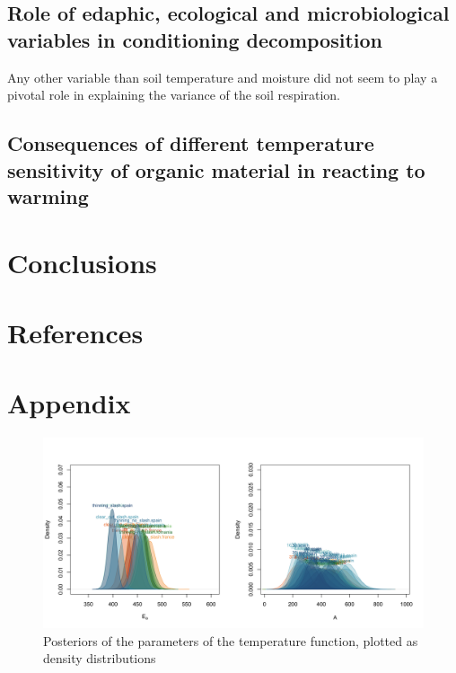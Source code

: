 \documentclass[
]{article}
\begin{document}
\subsection{Role of edaphic, ecological and microbiological variables in conditioning decomposition}\label{role-of-edaphic-ecological-and-microbiological-variables-in-conditioning-decomposition}

Any other variable than soil temperature and moisture did not seem to play a pivotal role in explaining the variance of the soil respiration.

\subsection{Consequences of different temperature sensitivity of organic material in reacting to warming}\label{consequences-of-different-temperature-sensitivity-of-organic-material-in-reacting-to-warming}

\section{Conclusions}\label{conclusions}

\section{References}\label{references}



\section{Appendix}\label{appendix}

\begin{figure}
\centering
\includegraphics{../Figures/posteriors_temp.png}
\caption{Posteriors of the parameters of the temperature function, plotted as density distributions}
\end{figure}
\end{document}
